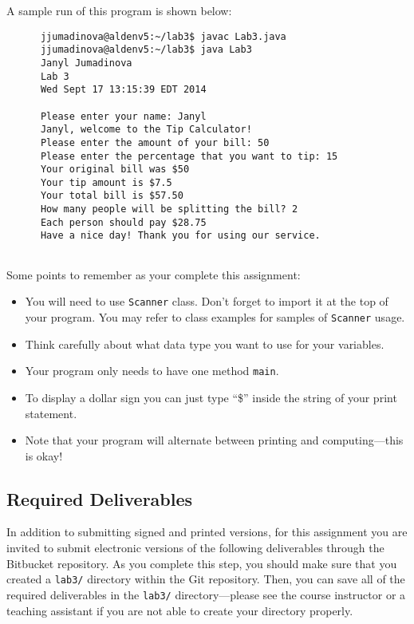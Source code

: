 A sample run of this program is shown below:
\begin{verbatim}
      jjumadinova@aldenv5:~/lab3$ javac Lab3.java
      jjumadinova@aldenv5:~/lab3$ java Lab3
      Janyl Jumadinova
      Lab 3
      Wed Sept 17 13:15:39 EDT 2014
      
      Please enter your name: Janyl
      Janyl, welcome to the Tip Calculator!
      Please enter the amount of your bill: 50
      Please enter the percentage that you want to tip: 15
      Your original bill was $50
      Your tip amount is $7.5
      Your total bill is $57.50
      How many people will be splitting the bill? 2
      Each person should pay $28.75
      Have a nice day! Thank you for using our service.
   
\end{verbatim}
\vspace{-0.2in}
Some points to remember as your complete this assignment:
\begin{itemize}
\item You will need to use {\tt Scanner} class. Don't forget to import it at the top of your program. You may refer to
  class examples for samples of {\tt Scanner} usage. 
\item Think carefully about what data type you want to use for your variables.
\item Your program only needs to have one method {\tt main}.
\item To display a dollar sign you can just type ``\$'' inside the string of your print statement. 
\item Note that your program will alternate between printing and computing---this 
is okay!
\end{itemize}

\vspace{-0.2in}
\subsection*{Required Deliverables}

In addition to submitting signed and printed versions, for this assignment you are invited to submit electronic versions
of the following deliverables through the Bitbucket repository. As you complete this step, you should make sure that you
created a {\tt lab3/} directory within the Git repository.  Then, you can save all of the required deliverables in the
{\tt lab3/} directory---please see the course instructor or a teaching assistant if you are not able to create your
directory properly. 

